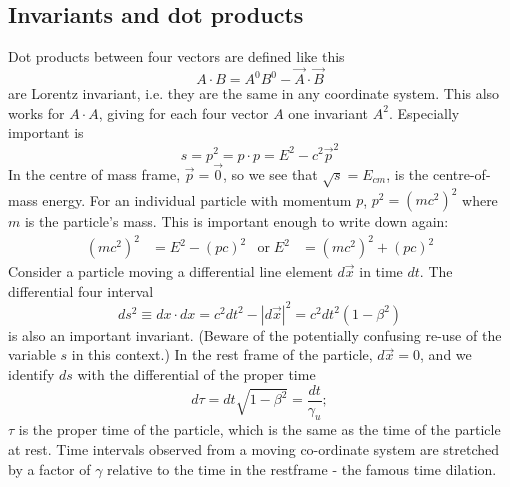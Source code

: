 \subsection{Invariants and dot products}
Dot products between four vectors are defined like this
\begin{equation}
A \cdot B = A^0 B^0 - \vec{A} \cdot \vec{B}
\end{equation}
are Lorentz invariant, i.e. they are the same in any coordinate system. This also works for $A \cdot A$, giving for each four vector $A$ one invariant $A^2$.
Especially important is
\begin{equation}
s = p^2 = p \cdot p = E^2 - c^2 \vec{p}^2
\end{equation}
In the centre of mass frame, $\vec{p}=\vec{0}$, so we see that $\sqrt{s}=E_{cm}$, is the centre-of-mass energy. For an individual particle with momentum $p$, $p^2=(mc^2)^2$ where $m$ is the particle's mass. This is important enough to write down again:
\begin{align}
(mc^2)^2 &= E^2 - (pc)^2 &\mathrm{or}\; E^2 &= (mc^2)^2 + (pc)^2
\end{align}
Consider a particle moving a differential line element $d\vec{x}$ in time $dt$. The differential four interval
\begin{equation}
ds^2 \equiv dx\cdot dx = c^2dt^2 - \left|d\vec{x}\right|^2 = c^2dt^2 \left(1-\beta^2\right)
\end{equation}
is also an important invariant. (Beware of the potentially confusing re-use of the variable $s$ in this context.) In the rest frame of the particle, $d\vec{x}=0$, and we identify $ds$ with the differential of the proper time
\begin{equation}
 d\tau = dt \sqrt{1-\beta^2} = \frac{dt}{\gamma_u};
\label{eq:proptime}
\end{equation}
 $\tau$ is the proper time of the particle, which is the same as the time of the particle at rest. Time intervals observed from a moving co-ordinate
system are stretched by a factor of $\gamma$ relative to the time in
the restframe - the famous time dilation.
\\

